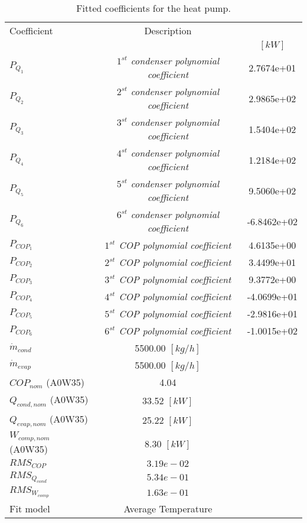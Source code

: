 \documentclass[english]{SPFShortReport}
\author{Dani Carbonell}
\begin{document}
\begin{table}[!ht]
\begin{small}
\caption{Fitted coefficients for the heat pump.}
\begin{center}
\resizebox{12cm}{!} 
{
\begin{tabular}{l | c c } 
\hline
\hline
Coefficient &Description & \\ 
 & &$[kW]$\\ 
\hline
$P_{Q_{1}}$ & \emph{$1^{st}$ condenser polynomial coefficient}  & 2.7674e+01    \\ 
$P_{Q_{2}}$ & \emph{$2^{st}$ condenser polynomial coefficient}  & 2.9865e+02    \\ 
$P_{Q_{3}}$ & \emph{$3^{st}$ condenser polynomial coefficient}  & 1.5404e+02    \\ 
$P_{Q_{4}}$ & \emph{$4^{st}$ condenser polynomial coefficient}  & 1.2184e+02    \\ 
$P_{Q_{5}}$ & \emph{$5^{st}$ condenser polynomial coefficient}  & 9.5060e+02    \\ 
$P_{Q_{6}}$ & \emph{$6^{st}$ condenser polynomial coefficient}  & -6.8462e+02    \\ 
\hline
$P_{COP_{1}}$ & \emph{$1^{st}$ COP polynomial coefficient}  & 4.6135e+00    \\ 
$P_{COP_{2}}$ & \emph{$2^{st}$ COP polynomial coefficient}  & 3.4499e+01    \\ 
$P_{COP_{3}}$ & \emph{$3^{st}$ COP polynomial coefficient}  & 9.3772e+00    \\ 
$P_{COP_{4}}$ & \emph{$4^{st}$ COP polynomial coefficient}  & -4.0699e+01    \\ 
$P_{COP_{5}}$ & \emph{$5^{st}$ COP polynomial coefficient}  & -2.9816e+01    \\ 
$P_{COP_{6}}$ & \emph{$6^{st}$ COP polynomial coefficient}  & -1.0015e+02    \\ 
\hline
$\dot m_{cond}$ & 5500.00 $[kg/h]$ \\ 
$\dot m_{evap}$ & 5500.00 $[kg/h]$ \\ 
\hline
$COP_{nom}$ (A0W35)& 4.04 \\ 
$Q_{cond,nom}$ (A0W35)& 33.52 $[kW]$\\ 
$Q_{evap,nom}$ (A0W35)& 25.22 $[kW]$\\ 
$W_{comp,nom}$ (A0W35)& 8.30 $[kW]$\\ 
\hline
 $RMS_{COP}$ & $3.19e-02$ \\ 
 $RMS_{Q_{cond}}$ & $5.34e-01$ \\ 
 $RMS_{W_{comp}}$ & $1.63e-01$ \\ 
\hline
Fit model & Average Temperature\\ 
\hline
\hline
\end{tabular}
}
\label{CoefTable}
\end{center}
\end{small}
\end{table}
\end{document}

